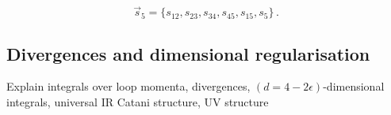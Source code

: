 \documentclass[main.tex]{subfiles}
\begin{document}
\begin{equation} \label{eq:sijs}
    \vec{s}_5 = \{s_{12}, s_{23}, s_{34}, s_{45}, s_{15}, s_5\}\,.
\end{equation}

\subsection{Divergences and dimensional regularisation} \label{sec:divergences}
Explain integrals over loop momenta, divergences, $(d=4-2\epsilon)$-dimensional integrals, universal IR Catani structure, UV structure
\end{document}
